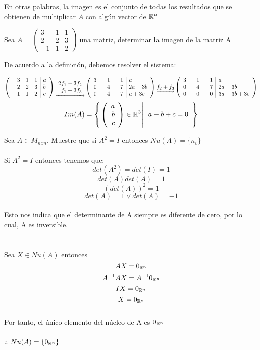 En otras palabras, la imagen es el conjunto de todas los resultados que se obtienen de multiplicar $A$ con algún vector de $\mathbb{R}^n$
\begin{ejemplo}
Sea $A=
\left(
\begin{array}{rrr}
3&1&1\\
2&2&3\\
-1&1&2
\end{array}
\right)$ una matriz, determinar la imagen de la matriz A
 
De acuerdo a la definición, debemos resolver el sistema:

$$\reducir{{rrr|l}}{3&1&1&a\\2&2&3&b\\-1&1&2&c}
\underrightarrow{\begin{array}{r}
    2f_1 - 3f_2 \\
    f_1 + 3f_3
\end{array}}
\reducir{rrr|l}{3&1&1&a\\0&-4&-7&2a-3b\\0&4&7&a+3c}
\underrightarrow{f_2 + f_3}
\reducir{rrr|l}{3&1&1&a\\0&-4&-7&2a-3b\\0&0&0&3a-3b+3c}$$
\[Im(A)=\left\{ \left. \left( \begin{array}{r} a\\ b\\ c \end{array} \right)  \in \mathbb{R}^3\right| \begin{array}{r}
a-b+c=0\\
\end{array} \right\}
\]

\end{ejemplo}

\begin{ejercicio}

Sea $A \in M_{nxn} $. Muestre que si $A^2=I$ entonces $Nu(A)=\{n_v\}$
~\\
\sol
~\\
Si $A^2=I$  entonces tenemos que:~\\
\[det(A^2)=det(I)=1\]
\[det(A)det(A)=1\]
\[(det(A))^2=1\]
\[det(A)=1 \vee det(A)=-1\]
~\\
Esto nos indica que el determinante de A siempre es diferente de cero, por lo cual, A es inversible.~\\
~\\
~\\
Sea $X\in Nu(A)$ entonces 
\[AX=0_{\mathbb{R}^n}\]
\[A^{-1}AX=A^{-1} 0_{\mathbb{R}^n}\]
\[IX=0_{\mathbb{R}^n}\]
\[X=0_{\mathbb{R}^n}\]
~\\
Por tanto, el único elemento del núcleo de A es $0_{\mathbb{R}^n}$
~\\
~\\
$\therefore$ $Nu(A)=\lbrace 0_{\mathbb{R}^n} \rbrace$

\end{ejercicio}

